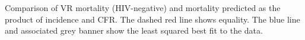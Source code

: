 Comparison of VR mortality (HIV-negative) and mortality predicted as the product of incidence and CFR. The dashed red line shows equality. The blue line and associated grey banner show the least squared best fit to the data.